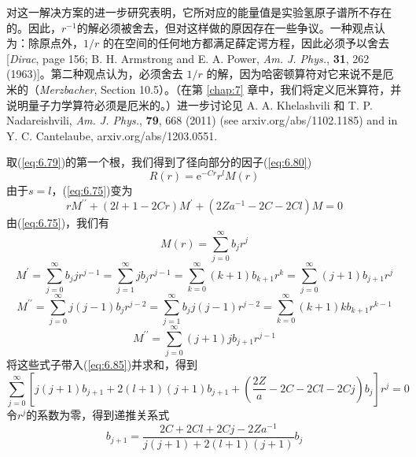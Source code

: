     对这一解决方案的进一步研究表明，它所对应的能量值是实验氢原子谱所不存在的。因此，$r^{-1}$的解必须被舍去，但对这样做的原因存在一些争议。一种观点认为：除原点外，$1/r$ 的在空间的任何地方都满足薛定谔方程，因此必须予以舍去[\textit{Dirac}, page 156; B. H. Armstrong and E. A. Power, \textit{Am. J. Phys.}, \textbf{31}, 262 (1963)]。第二种观点认为，必须舍去 $1/r$ 的解，因为哈密顿算符对它来说不是厄米的（\textit{Merzbacher}, Section 10.5）。（在第 \ref{chap:7} 章中，我们将定义厄米算符，并说明量子力学算符必须是厄米的。）进一步讨论见 A. A. Khelashvili 和 T. P. Nadareishvili, \textit{Am. J. Phys.}, \textbf{79}, 668 (2011) (see arxiv.org/abs/1102.1185) and in Y. C. Cantelaube, arxiv.org/abs/1203.0551.

    取(\ref{eq:6.79})的第一个根，我们得到了径向部分的因子(\ref{eq:6.80})
    \begin{equation}
        R\left(r\right) = \mathrm{e}^{-Cr}r^lM\left(r\right)
        \label{eq:6.84}
    \end{equation}
    由于$s=l$，(\ref{eq:6.75})变为
    \begin{equation}
        rM^{\prime\prime} + \left(2l+1-2Cr\right)M^{\prime} + \left(2Za^{-1}-2C-2Cl\right)M = 0
        \label{eq:6.85}
    \end{equation}
    由(\ref{eq:6.75})，我们有
    \begin{equation}
        M\left(r\right) = \sum_{j=0}^{\infty}b_jr^j
        \label{eq:6.86}
    \end{equation}
    \begin{equation*}
        M^{\prime} = \sum_{j=0}^{\infty}b_jjr^{j-1} = \sum_{j=1}^{\infty}jb_jr^{j-1} = \sum_{k=0}^{\infty}\left(k+1\right)b_{k+1}r^k = \sum_{j=0}^{\infty}\left(j+1\right)b_{j+1}r^j
    \end{equation*}
    \begin{equation*}
        M^{\prime\prime} = \sum_{j=0}^{\infty}j\left(j-1\right)b_jr^{j-2} = \sum_{j=1}^{\infty}b_jj\left(j-1\right)r^{j-2} = \sum_{k=0}^{\infty}\left(k+1\right)kb_{k+1}r^{k-1}
    \end{equation*}
    \begin{equation}
        M^{\prime\prime} = \sum_{j=0}^{\infty}\left(j+1\right)jb_{j+1}r^{j-1}
        \label{eq:6.87}
    \end{equation}
    将这些式子带入(\ref{eq:6.85})并求和，得到
    \begin{equation*}
        \sum_{j=0}^{\infty}\left[j\left(j+1\right)b_{j+1} + 2\left(l+1\right)\left(j+1\right)b_{j+1} + \left(\frac{2Z}{a} - 2C - 2Cl - 2Cj\right)b_j\right]r^j = 0
    \end{equation*}
    令$r^j$的系数为零，得到递推关系式
    \begin{equation}
        b_{j+1} = \frac{2C + 2Cl + 2Cj - 2Za^{-1}}{j\left(j+1\right) + 2\left(l+1\right)\left(j+1\right)}b_j
        \label{eq:6.88}
    \end{equation}

